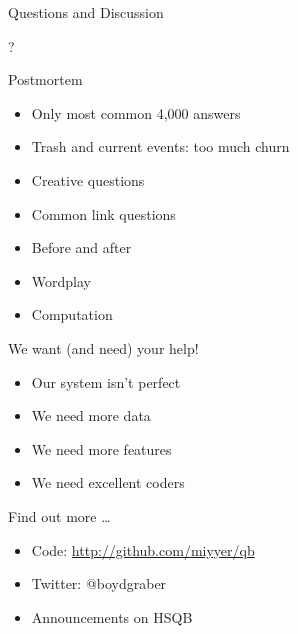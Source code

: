 \documentclass[compress]{beamer}
\begin{document}
\begin{frame}{Questions and Discussion}

	\begin{center}
	\begin{Huge}
	?
	\end{Huge}
	\end{center}

\end{frame}


\begin{frame}{Postmortem}

\begin{itemize}
	\item Only most common 4,000 answers
	\item Trash and current events: too much churn
	\item Creative questions
	\item Common link questions
	\item Before and after
	\item Wordplay
	\item Computation
\end{itemize}


\end{frame}

\begin{frame}{We want (and need) your help!}

	\begin{itemize}
		\item Our system isn't perfect
		\item We need more data
		\item We need more features
		\item We need excellent coders	
	\end{itemize}
	
	\pause

	\begin{block}{Find out more \dots}
		\begin{itemize}
			\item Code: \url{http://github.com/miyyer/qb}
			\item Twitter: @boydgraber
			\item Announcements on HSQB
		\end{itemize}
	\end{block}

\end{frame}
\end{document}
